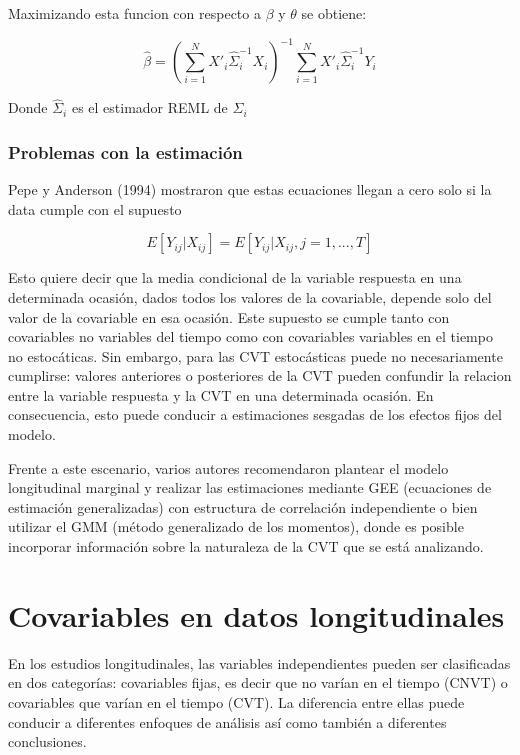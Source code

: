 \documentclass[spanish]{article}
\numberwithin{figure}{subsection}
\numberwithin{equation}{subsection}
\numberwithin{table}{subsection}
\begin{document}
Maximizando esta funcion con respecto a $\beta$ y $\theta$ se obtiene:

\[ \hat{\beta} = (\sum_{i=1}^{N} X'_i \hat{\varSigma}_i^{-1} X_i)^{-1}
\sum_{i=1}^{N} X'_i \hat{\varSigma}_i^{-1} Y_i\]

Donde $\hat{\varSigma}_i$ es el estimador REML de ${\varSigma_i}$

\subsubsection{Problemas con la estimación}

Pepe y Anderson (1994) mostraron que estas ecuaciones llegan a cero solo si la
data cumple con el supuesto

\begin{equation}
\label{estimation_issue}
	E[Y_{ij} | X_{ij}] = E[Y_{ij} | X_{ij}, j = 1, ..., T]
\end{equation}

Esto quiere decir que la media condicional de la variable respuesta en una
determinada ocasión, dados todos los valores de la covariable, depende solo del
valor de la covariable en esa ocasión. Este supuesto se cumple tanto con
covariables no variables del tiempo como con covariables variables en el tiempo
no estocáticas. Sin embargo, para las CVT estocásticas puede no necesariamente
cumplirse: valores anteriores o posteriores de la CVT pueden confundir la
relacion entre la variable respuesta y la CVT en una determinada ocasión. En
consecuencia, esto puede conducir a estimaciones sesgadas de los efectos fijos
del modelo.

Frente a este escenario, varios autores recomendaron plantear el modelo
longitudinal marginal y realizar las estimaciones mediante GEE (ecuaciones de
estimación generalizadas) con estructura de correlación independiente o bien
utilizar el GMM (método generalizado de los momentos), donde es posible
incorporar información sobre la naturaleza de la CVT que se está analizando.

\newpage

\section{Covariables en datos longitudinales}

En los estudios longitudinales, las variables independientes pueden ser
clasificadas en dos categorías: covariables fijas, es decir que no varían en el
tiempo (CNVT) o covariables que varían en el tiempo (CVT). La diferencia entre
ellas puede conducir a diferentes enfoques de análisis así como también a
diferentes conclusiones.
\end{document}
